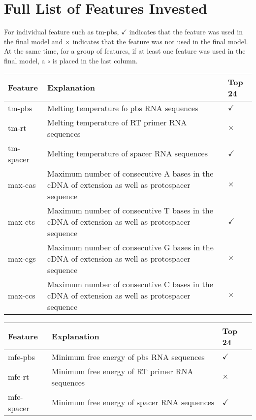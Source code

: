 \chapter{Full List of Features Invested}
\label{appendix:features}

For individual feature such as tm-pbs, $\checkmark$ indicates that the feature was used in the final model and $\times$ indicates that the feature was not used in the final model. At the same time, for a group of features, if at least one feature was used in the final model, a $\circ$ is placed in the last column. 

\begin{table}[ht]
    \centering
    \begin{tabular}{|p{}|p{}|p{}|}
        \hline
        \textbf{Feature} & \textbf{Explanation} & \textbf{Top 24} \\ 
        \hline
        tm-pbs& Melting temperature fo pbs RNA sequences & $\checkmark$ \\
        \hline
        tm-rt& Melting temperature of RT primer RNA sequences & $\times$ \\
        \hline
        tm-spacer& Melting temperature of spacer RNA sequences & $\checkmark$ \\
        \hline
        max-cas & Maximum number of consecutive A bases in the cDNA of extension as well as protospacer sequence & $\times$ \\
        \hline
        max-cts & Maximum number of consecutive T bases in the cDNA of extension as well as protospacer sequence & $\checkmark$ \\
        \hline
        max-cgs & Maximum number of consecutive G bases in the cDNA of extension as well as protospacer sequence & $\times$ \\
        \hline
        max-ccs & Maximum number of consecutive C bases in the cDNA of extension as well as protospacer sequence & $\times$ \\
        \hline
    \end{tabular}
\end{table}

\begin{table}[ht]
    \centering
    \begin{tabular}{|p{}|p{}|p{}|}
        \hline
        \textbf{Feature} & \textbf{Explanation} & \textbf{Top 24} \\ 
        \hline
        mfe-pbs & Minimum free energy of pbs RNA sequences & $\checkmark$ \\
        \hline
        mfe-rt & Minimum free energy of RT primer RNA sequences & $\times$ \\
        \hline
        mfe-spacer & Minimum free energy of spacer RNA sequences & $\checkmark$ \\
        \hline
    \end{tabular}
\end{table}


